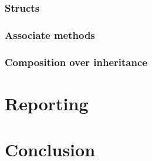 \documentclass[a4paper,10pt]{article}
\begin{document}
\subsubsection{Structs}
\subsubsection{Associate methods}
\subsubsection{Composition over inheritance}





\section{Reporting}

\section{Conclusion}




\end{document}
